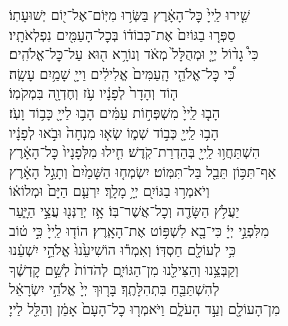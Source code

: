 \documentclass[twoside, openany, parskip=half, 11pt]{book}
\begin{document}
\begin{narrow}
 שִׁ֤ירוּ לַֽייָ֙ כׇּל־הָאָ֔רֶץ \hfill בַּשְּׂר֥וּ מִיּֽוֹם־אֶל־י֖וֹם יְשׁוּעָתֽוֹ׃ \\
 סַפְּר֤וּ בַגּוֹיִם֙ אֶת־כְּבוֹד֔וֹ \hfill בְּכׇל־הָעַמִּ֖ים נִפְלְאֹתָֽיו׃ \\
 כִּי֩ גָד֨וֹל יְיָ֤ וּמְהֻלָּל֙ מְאֹ֔ד \hfill וְנוֹרָ֥א ה֖וּא עַל־כׇּל־אֱלֹהִֽים׃ \\
 כִּ֠י כׇּל־אֱלֹהֵ֤י הָֽעַמִּים֙ אֱלִילִ֔ים \hfill וַייָ֖ שָׁמַ֥יִם עָשָֽׂה׃ \\
 ה֤וֹד וְהָדָר֙ לְפָנָ֔יו \hfill עֹ֥ז וְחֶדְוָ֖ה בִּמְקֹמֽוֹ׃ \\
 הָב֤וּ לַֽייָ֙ מִשְׁפְּח֣וֹת עַמִּ֔ים \hfill הָב֥וּ לַייָ֖ כָּב֥וֹד וָעֹֽז׃ \\
 הָב֥וּ לַֽייָ֖ כְּב֣וֹד שְׁמ֑וֹ \hfill שְׂא֤וּ מִנְחָה֙ וּבֹ֣אוּ לְפָנָ֔יו\\ הִשְׁתַּחֲו֥וּ לַֽייָ֖ בְּהַדְרַת־קֹֽדֶשׁ׃ \hfill
 חִ֤ילוּ מִלְּפָנָיו֙ כׇּל־הָאָ֔רֶץ\\ אַף־תִּכּ֥וֹן תֵּבֵ֖ל בַּל־תִּמּֽוֹט׃ \hfill
 יִשְׂמְח֤וּ הַשָּׁמַ֙יִם֙ וְתָגֵ֣ל הָאָ֔רֶץ\\ וְיֹאמְר֥וּ בַגּוֹיִ֖ם יְיָ֥ מָלָֽךְ׃ \hfill
 יִרְעַ֤ם הַיָּם֙ וּמְלוֹא֔וֹ\\ יַעֲלֹ֥ץ הַשָּׂדֶ֖ה וְכׇל־אֲשֶׁר־בּֽוֹ׃ \hfill
 אָ֥ז יְרַנְּנ֖וּ עֲצֵ֣י הַיָּ֑עַר\\ מִלִּפְנֵ֣י יְיָ֔ כִּי־בָ֖א לִשְׁפּ֥וֹט אֶת־הָאָֽרֶץ׃ \hfill
 הוֹד֤וּ לַֽייָ֙ כִּ֣י ט֔וֹב\\ כִּ֥י לְעוֹלָ֖ם חַסְדּֽוֹ׃ \hfill
 וְאִמְר֕וּ הוֹשִׁיעֵ֙נוּ֙ אֱלֹהֵ֣י יִשְׁעֵ֔נוּ\\ וְקַבְּצֵ֥נוּ וְהַצִּילֵ֖נוּ מִן־הַגּוֹיִ֑ם \hfill לְהֹדוֹת֙ לְשֵׁ֣ם קׇדְשֶׁ֔ךָ\\ לְהִשְׁתַּבֵּ֖חַ בִּתְהִלָּתֶֽךָ׃ \hfill
 בָּר֤וּךְ יְיָ֙ אֱלֹהֵ֣י יִשְׂרָאֵ֔ל\\ מִן־הָעוֹלָ֖ם וְעַ֣ד הָעֹלָ֑ם וַיֹּאמְר֤וּ כׇל־הָעָם֙ אָמֵ֔ן \hfill וְהַלֵּ֖ל לַייָ׃ 

\end{narrow}



\negline
\end{document}
